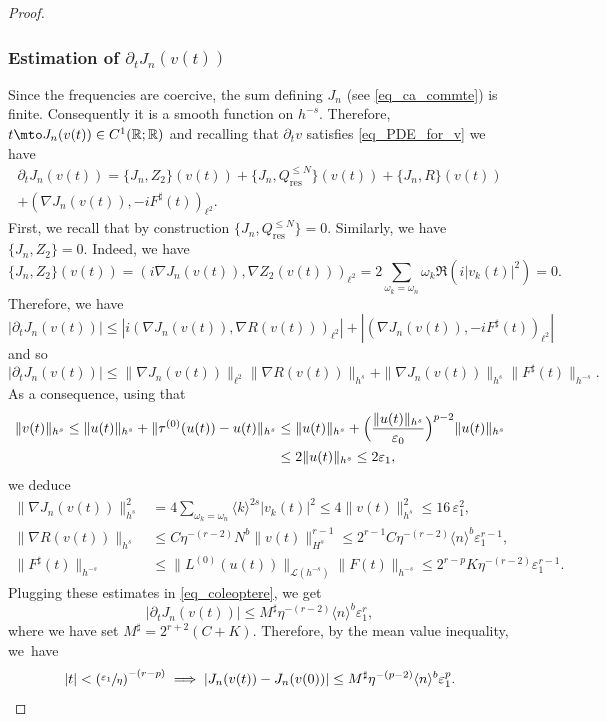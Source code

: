 \begin{proof}
\subsubsection*{Estimation of $\partial_t J_n(v(t))$}
Since the frequencies are coercive, the sum defining $J_n$ (see \eqref{eq_ca_commte}) is finite. Consequently it is a smooth function on $h^{-s}$. Therefore, $t\mto J_n(v(t)) \in C^1(\mathbb{R};\mathbb{R})$ and recalling that $\partial_t v$ satisfies \eqref{eq_PDE_for_v} we have
\begin{multline*}
\partial_t J_n(v(t)) = \{J_n, Z_2 \}(v(t))+ \{J_n, Q^{\leq N}_{\mathrm{res}} \}(v(t)) + \{J_n, R \}(v(t)) \\+ (\nabla J_n(v(t)),-i F^\sharp(t))_{\ell^2}.
\end{multline*}
First, we recall that by construction $\{J_n, Q^{\leq N}_{\mathrm{res}} \}=0$. Similarly, we have $\{J_n, Z_2 \}=0$. Indeed, we have
\[
\{J_n, Z_2 \}(v(t)) = (i\nabla J_n(v(t)), \nabla Z_2(v(t)))_{\ell^2}=2 \sum_{\omega_k = \omega_n} \omega_k \Re (i |v_k(t)|^2) = 0.
\]
Therefore, we have $|\partial_t J_n(v(t))| \leq | i(\nabla J_n(v(t)),\nabla R(v(t)))_{\ell^2} | +| (\nabla J_n(v(t)),-i F^\sharp(t))_{\ell^2}|$ and so
\begin{equation}
\label{eq_coleoptere}
|\partial_t J_n(v(t))| \leq \| \nabla J_n (v(t)) \|_{\ell^2} \| \nabla R (v(t)) \|_{h^s} + \| \nabla J_n (v(t)) \|_{h^{s}} \| F^\sharp(t) \|_{h^{-s}}.
\end{equation}
As a consequence, using that
\begin{equation*}
\begin{split}
\|v(t)\|_{h^s} \leq \|u(t) \|_{h^s} + \| \tau^{(0)}(u(t)) - u(t) \|_{h^s} &\leq \|u(t) \|_{h^s} + \Bigl(\frac{\| u(t)\|_{h^s}}{\varepsilon_0} \Bigr)^{p-2} \|u(t)\|_{h^s} \\
&\leq 2 \|u(t) \|_{h^s} \leq 2\varepsilon_1,
\end{split}
\end{equation*}
we deduce
\begin{equation*}
\begin{split}
\| \nabla J_n (v(t)) \|_{h^s}^2 &= 4 \sum_{\omega_k = \omega_n} \langle k \rangle^{2s} |v_k(t)|^2 \leq 4 \| v(t) \|_{h^s}^2 \leq 16\, \varepsilon_1^2, \\
\| \nabla R (v(t)) \|_{h^s} &\leq C \eta^{-(r-2)} N^{b} \|v(t)\|_{H^s}^{r-1} \leq 2^{r-1} C \eta^{-(r-2)} \langle n\rangle^{b} \varepsilon_1^{r-1}, \\
\| F^\sharp(t) \|_{h^{-s}} &\leq \| L^{(0)}(u(t)) \|_{\mathscr{L}(h^{-s})} \| F(t) \|_{h^{-s}} \leq 2^{r-p} K \eta^{-(r-2)} \varepsilon_1^{r-1}.
\end{split}
\end{equation*}
Plugging these estimates in \eqref{eq_coleoptere}, we get
\[
|\partial_t J_n(v(t))| \leq M^\sharp \eta^{-(r-2)} \langle n \rangle^{b} \varepsilon_1^{r},
\]
where we have set $M^\sharp = 2^{r+2} (C+K)$.
Therefore, by the mean value inequality, we~have
\[
|t|< \left(\sfrac{ \varepsilon_1}{\eta} \right)^{-(r-p)} \implies |J_n(v(t)) - J_n(v(0))| \leq M^\sharp \eta^{-(p-2)} \langle n \rangle^{b} \varepsilon_1^{p}.
\]


\end{proof}
